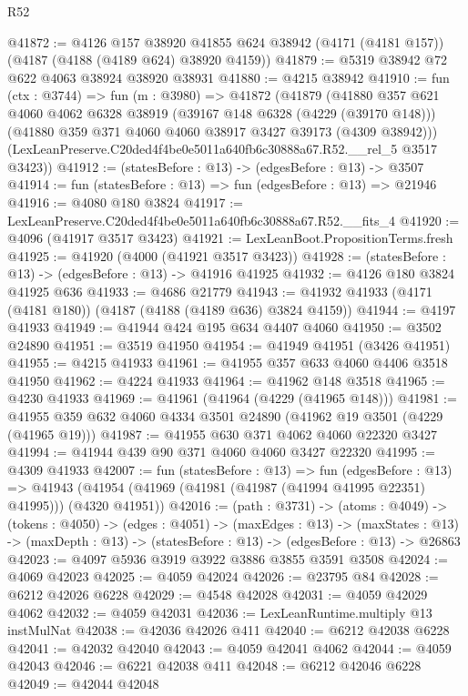 \begin{lexlean}{R52}
\begin{coremodule}
@41872 := @4126
    @157
    @38920
    @41855
    @624
    @38942
    (@4171 (@4181 @157))
    (@4187 (@4188 (@4189 @624) @38920 @4159))
@41879 := @5319 @38942 @72 @622 @4063 @38924 @38920 @38931
@41880 := @4215 @38942
@41910 := fun (ctx : @3744) =>
  fun (m : @3980) =>
  @41872
    (@41879
      (@41880
        @357
        @621
        @4060
        @4062
        @6328
        @38919
        (@39167 @148 @6328 (@4229 (@39170 @148)))
        (@41880 @359 @371 @4060 @4060 @38917 @3427 @39173 (@4309 @38942)))
      (LexLeanPreserve.C20ded4f4be0e5011a640fb6c30888a67.R52.__rel_5 @3517 @3423))
@41912 := (statesBefore : @13) -> (edgesBefore : @13) -> @3507
@41914 := fun (statesBefore : @13) => fun (edgesBefore : @13) => @21946
@41916 := @4080 @180 @3824
@41917 := LexLeanPreserve.C20ded4f4be0e5011a640fb6c30888a67.R52.__fits_4
@41920 := @4096 (@41917 @3517 @3423)
@41921 := LexLeanBoot.PropositionTerms.fresh
@41925 := @41920 (@4000 (@41921 @3517 @3423))
@41928 := (statesBefore : @13) -> (edgesBefore : @13) -> @41916 @41925
@41932 := @4126 @180 @3824 @41925 @636
@41933 := @4686 @21779
@41943 := @41932 @41933 (@4171 (@4181 @180)) (@4187 (@4188 (@4189 @636) @3824 @4159))
@41944 := @4197 @41933
@41949 := @41944 @424 @195 @634 @4407 @4060
@41950 := @3502 @24890
@41951 := @3519 @41950
@41954 := @41949 @41951 (@3426 @41951)
@41955 := @4215 @41933
@41961 := @41955 @357 @633 @4060 @4406 @3518 @41950
@41962 := @4224 @41933
@41964 := @41962 @148 @3518
@41965 := @4230 @41933
@41969 := @41961 (@41964 (@4229 (@41965 @148)))
@41981 := @41955 @359 @632 @4060 @4334 @3501 @24890 (@41962 @19 @3501 (@4229 (@41965 @19)))
@41987 := @41955 @630 @371 @4062 @4060 @22320 @3427
@41994 := @41944 @439 @90 @371 @4060 @4060 @3427 @22320
@41995 := @4309 @41933
@42007 := fun (statesBefore : @13) =>
  fun (edgesBefore : @13) =>
  @41943 (@41954 (@41969 (@41981 (@41987 (@41994 @41995 @22351) @41995))) (@4320 @41951))
@42016 := (path : @3731) ->
  (atoms : @4049) ->
  (tokens : @4050) ->
  (edges : @4051) ->
  (maxEdges : @13) ->
  (maxStates : @13) -> (maxDepth : @13) -> (statesBefore : @13) -> (edgesBefore : @13) -> @26863
@42023 := @4097 @5936 @3919 @3922 @3886 @3855 @3591 @3508
@42024 := @4069 @42023
@42025 := @4059 @42024
@42026 := @23795 @84
@42028 := @6212 @42026 @6228
@42029 := @4548 @42028
@42031 := @4059 @42029 @4062
@42032 := @4059 @42031
@42036 := LexLeanRuntime.multiply @13 instMulNat
@42038 := @42036 @42026 @411
@42040 := @6212 @42038 @6228
@42041 := @42032 @42040
@42043 := @4059 @42041 @4062
@42044 := @4059 @42043
@42046 := @6221 @42038 @411
@42048 := @6212 @42046 @6228
@42049 := @42044 @42048

\end{coremodule}
\end{lexlean}
